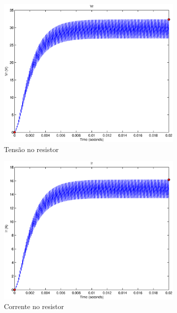 \documentclass{article}
\begin{document}
\begin{figure}[H]
	\centering
	\begin{subfigure}[b]{0.4\linewidth}
		\includegraphics[width=\linewidth]{matlab/boost/b_vr}
		\caption{Tensão no resistor}
	\end{subfigure}
	\begin{subfigure}[b]{0.4\linewidth}
		\centering
		\includegraphics[width=\linewidth]{matlab/boost/b_ir}
		\caption{Corrente no resistor}
	\end{subfigure}
	\begin{subfigure}[b]{0.4\linewidth}

\end{subfigure}
\end{figure}
\end{document}
